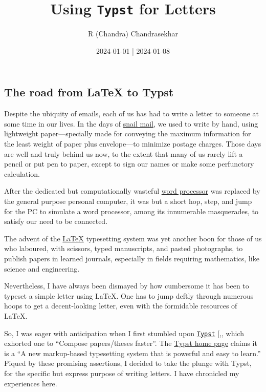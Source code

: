 \documentclass[
  a4paper,
]{article}
\title{Using \texttt{Typst} for Letters}
\author{R (Chandra) Chandrasekhar}
\date{2024-01-01 | 2024-01-08}
\begin{document}
\maketitle

\thispagestyle{empty}


\subsection{The road from LaTeX to
Typst}\label{the-road-from-latex-to-typst}

Despite the ubiquity of emails, each of us has had to write a letter to
someone at some time in our lives. In the days of
\href{https://www.merriam-webster.com/dictionary/snail\%20mail}{snail
mail}, we used to write by hand, using lightweight paper---specially
made for conveying the maximum information for the least weight of paper
plus envelope---to minimize postage charges. Those days are well and
truly behind us now, to the extent that many of us rarely lift a pencil
or put pen to paper, except to sign our names or make some perfunctory
calculation.

After the dedicated but computationally wasteful
\href{https://www.webopedia.com/definitions/word-processor/}{word
processor} was replaced by the general purpose personal computer, it was
but a short hop, step, and jump for the PC to simulate a word processor,
among its innumerable masquerades, to satisfy our need to be connected.

The advent of the \href{https://www.latex-project.org/}{LaTeX}
typesetting system was yet another boon for those of us who laboured,
with scissors, typed manuscripts, and pasted photographs, to publish
papers in learned journals, especially in fields requiring mathematics,
like science and engineering.

Nevertheless, I have always been dismayed by how cumbersome it has been
to typeset a simple letter using LaTeX. One has to jump deftly through
numerous hoops to get a decent-looking letter, even with the formidable
resources of LaTeX.

So, I was eager with anticipation when I first stumbled upon
\href{https://typst.app/}{\texttt{Typst}}
{[},\citeproc{ref-typst02}{2}{]}, which
exhorted one to ``Compose papers/theses faster''. The
\href{https://github.com/typst/typst}{Typst home page} claims it is a
``A new markup-based typesetting system that is powerful and easy to
learn.'' Piqued by these promising assertions, I decided to take the
plunge with Typst, for the specific but express purpose of writing
letters. I have chronicled my experiences here.
\end{document}
